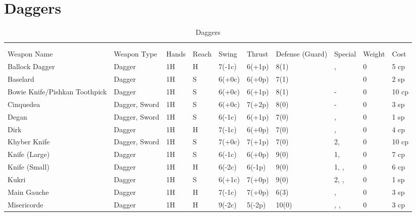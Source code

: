 \documentclass[oneside,11pt,english]{book}
\begin{document}
\section{Daggers}\vspace{-15pt}
\begin{longtabu} to 1\linewidth {X[2,l]XX[-1,c]X[-1,c]XXX[-1,c]X[2,l]X[-3,c]X[-3,r]}
	\captionsetup{labelformat=blank,textformat=empty}
	\caption{Daggers}\vspace{-15pt}\\
	\label{tab:Daggers List}\\\endfirsthead
Weapon Name						&Weapon Type	&Hands&Reach&Swing&Thrust&Defense (Guard)&Special						&Weight	&Cost\\\toprule\endhead
Ballock Dagger					&Dagger			&1H	&H	&7(-1c)	&6(+1p)	&8(1)	&, 				&0	&5 cp\\
Baselard						&Dagger			&1H	&S	&6(+0c)	&6(+0p)	&7(1)	&							&0	&2 sp\\
Bowie Knife/Pishkan Toothpick	&Dagger			&1H	&S	&6(+0c)	&6(+1p)	&8(1)	&-										&0	&10 cp\\
Cinquedea						&Dagger, Sword	&1H	&S	&6(+0c)	&7(+2p)	&8(0)	&-										&0	&3 sp\\
Degan							&Dagger, Sword	&1H	&S	&6(-1c)	&6(+1p)	&7(0)	&, 				&0	&1 sp\\
Dirk							&Dagger			&1H	&H	&7(-1c)	&6(+0p)	&7(0)	&, 				&0	&4 cp\\
Khyber Knife					&Dagger, Sword	&1H	&S	&7(+0c)	&7(+1p)	&7(0)	& 2, 						&0	&10 cp\\
Knife (Large)					&Dagger			&1H	&S	&6(-1c)	&6(+0p)	&9(0)	& 1, 					&0	&7 cp\\
Knife (Small)					&Dagger			&1H	&H	&6(-2c)	&6(-1p)	&9(0)	& 1, , 		&0	&6 cp\\
Kukri							&Dagger			&1H	&S	&6(+1c)	&7(+0p)	&9(0)	& 2, , 		&0	&1 sp\\
Main Gauche						&Dagger			&1H	&H	&7(-1c)	&7(+0p)	&6(3)	&, 			&0	&3 sp\\
Misericorde						&Dagger			&1H	&H	&9(-2c)	&5(-2p)	&10(0)	&, , 	&0	&3 cp\\

\end{longtabu}
\end{document}
